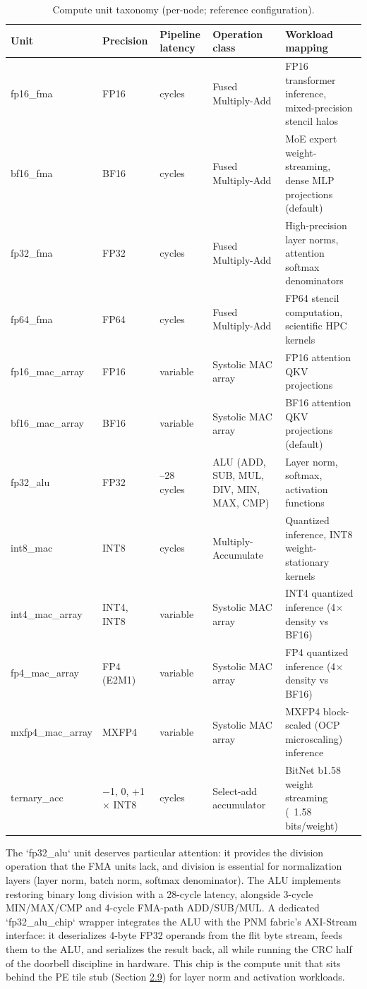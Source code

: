 \documentclass[10pt,twocolumn]{article}
\begin{document}
\begin{table}[t]
\centering
\footnotesize
\caption{Compute unit taxonomy (per-node; reference configuration).}\label{tab:5}
\begin{tabularx}{\textwidth}{>{\hsize=0.5346\hsize}X>{\hsize=0.8491\hsize}X>{\hsize=0.5031\hsize}X>{\hsize=1.2264\hsize}X>{\hsize=1.8868\hsize}X}
\toprule
Unit & Precision & Pipeline latency & Operation class & Workload mapping \\
\midrule
fp16\_fma & FP16 & 3 cycles & Fused Multiply-Add & FP16 transformer inference, mixed-precision stencil halos \\
bf16\_fma & BF16 & 3 cycles & Fused Multiply-Add & MoE expert weight-streaming, dense MLP projections (default) \\
fp32\_fma & FP32 & 3 cycles & Fused Multiply-Add & High-precision layer norms, attention softmax denominators \\
fp64\_fma & FP64 & 3 cycles & Fused Multiply-Add & FP64 stencil computation, scientific HPC kernels \\
fp16\_mac\_array & FP16 & variable & Systolic MAC array & FP16 attention QKV projections \\
bf16\_mac\_array & BF16 & variable & Systolic MAC array & BF16 attention QKV projections (default) \\
fp32\_alu & FP32 & 3--28 cycles & ALU (ADD, SUB, MUL, DIV, MIN, MAX, CMP) & Layer norm, softmax, activation functions \\
int8\_mac & INT8 & 2 cycles & Multiply-Accumulate & Quantized inference, INT8 weight-stationary kernels \\
int4\_mac\_array & INT4, INT8 & variable & Systolic MAC array & INT4 quantized inference (4$\times$ density vs BF16) \\
fp4\_mac\_array & FP4 (E2M1) & variable & Systolic MAC array & FP4 quantized inference (4$\times$ density vs BF16) \\
mxfp4\_mac\_array & MXFP4 & variable & Systolic MAC array & MXFP4 block-scaled (OCP microscaling) inference \\
ternary\_acc & {$-$1, 0, +1} $\times$ INT8 & 3 cycles & Select-add accumulator & BitNet b1.58 weight streaming (~1.58 bits/weight) \\
\bottomrule
\end{tabularx}
\end{table}


The `fp32\_alu` unit deserves particular attention: it provides the division operation that the FMA units lack, and division is essential for normalization layers (layer norm, batch norm, softmax denominator). The ALU implements restoring binary long division with a 28-cycle latency, alongside 3-cycle MIN/MAX/CMP and 4-cycle FMA-path ADD/SUB/MUL. A dedicated `fp32\_alu\_chip` wrapper integrates the ALU with the PNM fabric's AXI-Stream interface: it deserializes 4-byte FP32 operands from the flit byte stream, feeds them to the ALU, and serializes the result back, all while running the CRC half of the doorbell discipline in hardware. This chip is the compute unit that sits behind the PE tile stub (Section \hyperref[sec:2.9]{2.9}) for layer norm and activation workloads.
\end{document}
